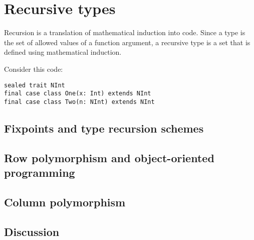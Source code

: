 
\chapter{Recursive types\label{chap:Recursive-types}}

Recursion is a translation of mathematical induction into code. Since
a type is the set of allowed values of a function argument, a recursive
type is a set that is defined using mathematical induction.

Consider this code:
\begin{lstlisting}
sealed trait NInt
final case class One(x: Int) extends NInt
final case class Two(n: NInt) extends NInt
\end{lstlisting}


\section{Fixpoints and type recursion schemes}

\section{Row polymorphism and object-oriented programming}

\section{Column polymorphism}

\section{Discussion}

\begin{comment}
\end{comment}

